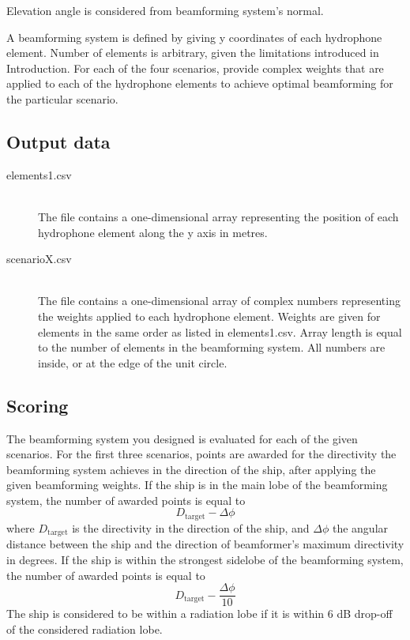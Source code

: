 \documentclass{article}[a4paper]
\begin{document}
Elevation angle is considered from beamforming system's normal.

A beamforming system is defined by giving y coordinates of each hydrophone element. Number of elements is arbitrary, given the limitations introduced in Introduction. For each of the four scenarios, provide complex weights that are applied to each of the hydrophone elements to achieve optimal beamforming for the particular scenario.

\subsection*{Output data}

\begin{description}
	\item[elements1.csv] \,\\ The file contains a one-dimensional array representing the position of each hydrophone element along the y axis in metres.
	\item[scenarioX.csv] \,\\ The file contains a one-dimensional array of complex numbers representing the weights applied to each hydrophone element. Weights are given for elements in the same order as listed in elements1.csv. Array length is equal to the number of elements in the beamforming system. All numbers are inside, or at the edge of the unit circle.
\end{description}

\subsection*{Scoring}

The beamforming system you designed is evaluated for each of the given scenarios. For the first three scenarios, points are awarded for the directivity the beamforming system achieves in the direction of the ship, after applying the given beamforming weights. If the ship is in the main lobe of the beamforming system, the number of awarded points is equal to
\[ D_\textrm{target} - \varDelta \phi \]
where $D_\textrm{target}$ is the directivity in the direction of the ship, and $\varDelta \phi$ the angular distance between the ship and the direction of beamformer's maximum directivity in degrees. If the ship is within the strongest sidelobe of the beamforming system, the number of awarded points is equal to
\[ D_\textrm{target} - \dfrac{\varDelta \phi}{10} \]
The ship is considered to be within a radiation lobe if it is within 6 dB drop-off of the considered radiation lobe.
\end{document}
